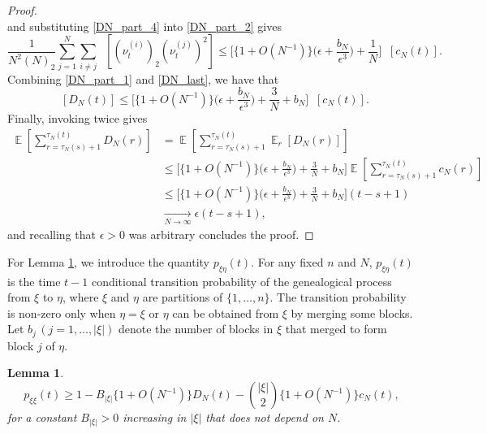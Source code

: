 \documentclass{article} %
\newtheorem{lemma}{Lemma}
\theoremstyle{definition}
\DeclareMathOperator{\E}{\mathbb{E}}
\DeclareMathOperator{\Et}{\mathbb{E}_t}
\newcommand{\1}[1]{\mathbbm{1}_{\{#1\}}}
\begin{document}
\begin{proof}
\begin{equation}
\end{equation}
and substituting \eqref{DN_part_4} into \eqref{DN_part_2} gives
\begin{equation}
\frac{ 1 }{ N^2 ( N )_2 } \sum_{ j=1 }^N \sum_{ i \neq j } \Et\left[ ( \nu_t^{(i)} )_2 ( \nu_t^{(j)} )^2 \right]
\leq \Bigg[ \{ 1 + O( N^{ -1 } ) \} \Big( \epsilon + \frac{ b_N }{ \epsilon^3 } \Big) + \frac{ 1 }{ N } \Bigg] \Et[ c_N( t ) ] . \label{DN_last}
\end{equation}
Combining \eqref{DN_part_1} and \eqref{DN_last}, we have that
\begin{equation*}
\Et[ D_N(t) ] \leq \Bigg[ \{ 1 + O( N^{ -1 } ) \} \Bigg( \epsilon + \frac{ b_N }{ \epsilon^3 } \Bigg) + \frac{ 3 }{ N } + b_N \Bigg] \Et[ c_N(t) ] .
\end{equation*}
Finally, invoking \cite[Lemma 2]{koskela2018} twice gives
\begin{align*}
\E\left[ \sum_{ r = \tau_N( s ) + 1 }^{ \tau_N( t ) } D_N( r ) \right] 
&= \E\left[ \sum_{ r = \tau_N( s ) + 1 }^{ \tau_N( t ) } \E_r[ D_N( r ) ] \right] \\
&\leq \Bigg[ \{ 1 + O( N^{ -1 } ) \} \Bigg( \epsilon + \frac{ b_N }{ \epsilon^3 } \Bigg) + \frac{ 3 }{ N } + b_N \Bigg] 
\E\left[ \sum_{ r = \tau_N( s ) + 1 }^{ \tau_N( t ) } c_N( r ) \right] \\
&\leq \Bigg[ \{ 1 + O( N^{ -1 } ) \} \Bigg( \epsilon + \frac{ b_N }{ \epsilon^3 } \Bigg) + \frac{ 3 }{ N } + b_N \Bigg] ( t - s + 1 )\\
& \underset{N\to\infty}{\longrightarrow} \epsilon ( t - s + 1 ),
\end{align*}
and recalling that $\epsilon > 0$ was arbitrary concludes the proof.
\end{proof}

For Lemma \ref{lem:removeass4}, we introduce the quantity $p_{\xi\eta}(t)$. For any fixed $n$ and $N$, $p_{\xi\eta}(t)$ is the time $t-1$ conditional transition probability of the genealogical process from $\xi$ to $\eta$, where $\xi$ and $\eta$ are partitions of $\{1,\dots,n\}$. The transition probability is non-zero only when $\eta =\xi$ or $\eta$ can be obtained from $\xi$ by merging some blocks.
Let $b_j\, (j=1,\dots,|\xi|)$ denote the number of blocks in $\xi$ that merged to form block $j$ of $\eta$.

\begin{lemma}\label{lem:removeass4}
\begin{equation}\label{eq:removeass4}
p_{ \xi \xi }( t ) \geq 1 - B_{ | \xi |  } \{ 1 + O( N^{ -1 } ) \} D_N( t ) -  \binom{ | \xi | }{ 2 } \{ 1 + O( N^{-1} ) \} c_N( t ) ,
\end{equation}
for a constant $B_{ | \xi |  } > 0$ increasing in $|\xi|$ that does not depend on $N$.
\end{lemma}
\end{document}
